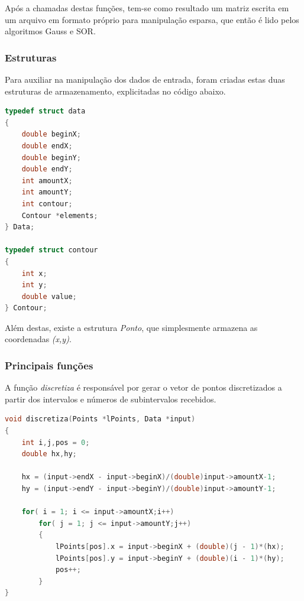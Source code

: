 \documentclass[
	11pt,				%
	oneside,			%
	a4paper,			%
	english,			%
	brazil,				%
	]{article}
\begin{document}
Após a chamadas destas funções, tem-se como resultado um matriz escrita em um arquivo em formato próprio para manipulação esparsa, que então é lido pelos algoritmos Gauss e SOR.

\subsubsection{Estruturas}
Para auxiliar na manipulação dos dados de entrada, foram criadas estas duas estruturas de armazenamento, explicitadas no código abaixo.

\begin{lstlisting}[language=C, caption=Estruturas de entrada]
typedef struct data
{
	double beginX;
	double endX;
	double beginY;
	double endY;
	int amountX;
	int amountY;
	int contour;
	Contour *elements;
} Data;

typedef struct contour
{
	int x;
	int y;
	double value;
} Contour;
\end{lstlisting}

Além destas, existe a estrutura \textit{Ponto}, que simplesmente armazena as coordenadas \textit{(x,y)}.

\subsubsection{Principais funções}

A função \textit{discretiza} é responsável por gerar o vetor de pontos discretizados a partir dos intervalos e números de subintervalos recebidos.
\begin{lstlisting}[language=C, caption=Função Discretiza]
void discretiza(Points *lPoints, Data *input)
{
	int i,j,pos = 0;
	double hx,hy;

	hx = (input->endX - input->beginX)/(double)input->amountX-1;
	hy = (input->endY - input->beginY)/(double)input->amountY-1;

	for( i = 1; i <= input->amountX;i++)
		for( j = 1; j <= input->amountY;j++)
		{
			lPoints[pos].x = input->beginX + (double)(j - 1)*(hx);
			lPoints[pos].y = input->beginY + (double)(i - 1)*(hy);
			pos++;
		}
}
\end{lstlisting}
\end{document}
